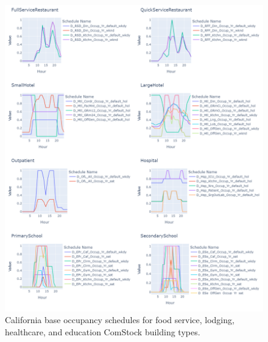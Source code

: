 \begin{figure}
    \centering
    \includegraphics[trim={0 0 0 0}, clip,  %
    width=\textwidth]{figures/occupancy_schedules_deer_1.png}
    \caption[California base occupancy schedules] {California base occupancy schedules for food service, lodging, healthcare, and education ComStock building types.}
    \label{fig:occupancy_schedules_deer_1}
\end{figure}

